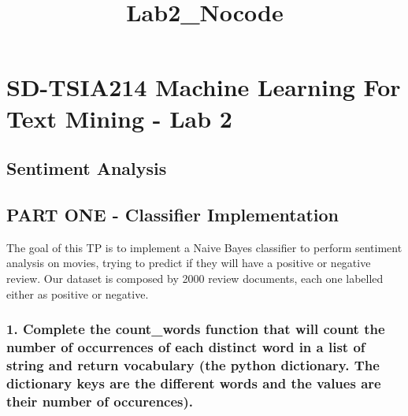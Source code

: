 \documentclass[11pt]{article}
\title{Lab2\_Nocode}
\begin{document}
    
    
    \maketitle
    
    

    
    \section{SD-TSIA214 Machine Learning For Text Mining - Lab
2}\label{sd-tsia214-machine-learning-for-text-mining---lab-2}

\subsection{Sentiment Analysis}\label{sentiment-analysis}

\subsection{PART ONE - Classifier
Implementation}\label{part-one---classifier-implementation}

The goal of this TP is to implement a Naive Bayes classifier to perform
sentiment analysis on movies, trying to predict if they will have a
positive or negative review. Our dataset is composed by 2000 review
documents, each one labelled either as positive or negative.

    \subsubsection{1. Complete the count\_words function that will count the
number of occurrences of each distinct word in a list of string and
return vocabulary (the python dictionary. The dictionary keys are the
different words and the values are their number of
occurences).}\label{complete-the-count_words-function-that-will-count-the-number-of-occurrences-of-each-distinct-word-in-a-list-of-string-and-return-vocabulary-the-python-dictionary.-the-dictionary-keys-are-the-different-words-and-the-values-are-their-number-of-occurences.}
\end{document}
